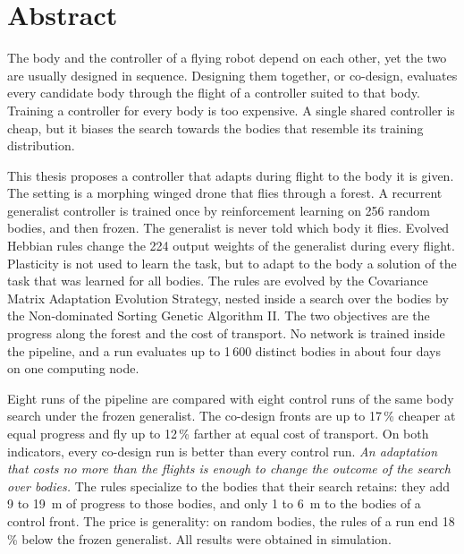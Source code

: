 \chapter*{Abstract}
\label{ch:abstract}

The body and the controller of a flying robot depend on each other, yet the two are usually designed in sequence. Designing them together, or co-design, evaluates every candidate body through the flight of a controller suited to that body. Training a controller for every body is too expensive. A single shared controller is cheap, but it biases the search towards the bodies that resemble its training distribution.

This thesis proposes a controller that adapts during flight to the body it is given. The setting is a morphing winged drone that flies through a forest. A recurrent generalist controller is trained once by reinforcement learning on 256 random bodies, and then frozen. The generalist is never told which body it flies. Evolved Hebbian rules change the 224 output weights of the generalist during every flight. Plasticity is not used to learn the task, but to adapt to the body a solution of the task that was learned for all bodies. The rules are evolved by the Covariance Matrix Adaptation Evolution Strategy, nested inside a search over the bodies by the Non-dominated Sorting Genetic Algorithm II. The two objectives are the progress along the forest and the cost of transport. No network is trained inside the pipeline, and a run evaluates up to 1\,600 distinct bodies in about four days on one computing node.

Eight runs of the pipeline are compared with eight control runs of the same body search under the frozen generalist. The co-design fronts are up to 17\,\% cheaper at equal progress and fly up to 12\,\% farther at equal cost of transport. On both indicators, every co-design run is better than every control run. \emph{An adaptation that costs no more than the flights is enough to change the outcome of the search over bodies.} The rules specialize to the bodies that their search retains: they add 9 to 19~m of progress to those bodies, and only 1 to 6~m to the bodies of a control front. The price is generality: on random bodies, the rules of a run end 18\,\% below the frozen generalist. All results were obtained in simulation.

